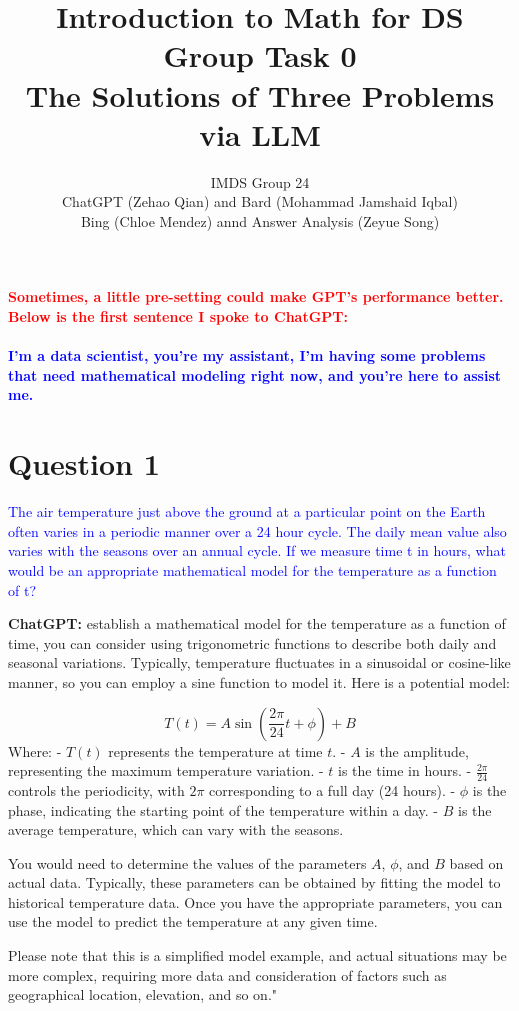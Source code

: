 \documentclass[11pt]{article} %
\title{Introduction to Math for DS Group Task 0 \\ The Solutions of Three Problems via LLM}
\author{IMDS Group 24 \\ ChatGPT (Zehao Qian) and Bard (Mohammad Jamshaid Iqbal) \\ Bing (Chloe Mendez) annd Answer Analysis (Zeyue Song)}
\begin{document}
\maketitle

\paragraph{\textcolor{red}{Sometimes, a little pre-setting could make GPT's performance better. Below is the first sentence I spoke to ChatGPT:}}

\paragraph{\textcolor{blue}{I'm a data scientist, you're my assistant, I'm having some problems that need mathematical modeling right now, and you're here to assist me.}}

\section{Question 1}
\textcolor{blue}{The air temperature just above the ground at a particular point on the Earth often varies in a periodic manner over a 24 hour cycle. The daily mean value also varies with the seasons over an annual cycle. If we measure time t in hours, what would be an appropriate mathematical model for the temperature as a function of t? }

\begin{mdframed}[
        backgroundcolor=white,  %
        linecolor=black,        %
        leftmargin=5pt,         %
        rightmargin=5pt,        %
        linewidth=2pt           %
    ]
    \textbf{ChatGPT: } establish a mathematical model for the temperature as a function of time, you can consider using trigonometric functions to describe both daily and seasonal variations. Typically, temperature fluctuates in a sinusoidal or cosine-like manner, so you can employ a sine function to model it. Here is a potential model: \par
    \[T(t) = A \sin\left(\frac{2\pi}{24} t + \phi\right) + B\]
    Where:
    - \(T(t)\) represents the temperature at time \(t\).
    - \(A\) is the amplitude, representing the maximum temperature variation.
    - \(t\) is the time in hours.
    - \(\frac{2\pi}{24}\) controls the periodicity, with \(2\pi\) corresponding to a full day (24 hours).
    - \(\phi\) is the phase, indicating the starting point of the temperature within a day.
    - \(B\) is the average temperature, which can vary with the seasons. \par
    You would need to determine the values of the parameters \(A\), \(\phi\), and \(B\) based on actual data. Typically, these parameters can be obtained by fitting the model to historical temperature data. Once you have the appropriate parameters, you can use the model to predict the temperature at any given time. \par
    Please note that this is a simplified model example, and actual situations may be more complex, requiring more data and consideration of factors such as geographical location, elevation, and so on."
\end{mdframed}
\end{document}

